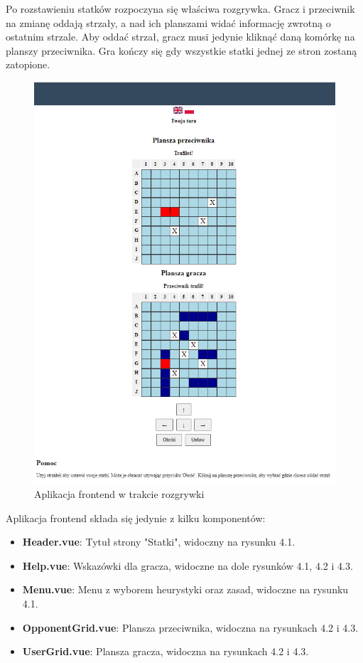 Po rozstawieniu statków rozpoczyna się właściwa rozgrywka. Gracz i przeciwnik na zmianę oddają strzały, a nad ich planszami widać informację zwrotną o ostatnim strzale. Aby oddać strzał, gracz musi jedynie kliknąć daną komórkę na planszy przeciwnika. Gra kończy się gdy wszystkie statki jednej ze stron zostaną zatopione. 

\begin{figure}[!h]
    \label{fig:frontend--in-game}
    \centering \includegraphics[width=1\linewidth]{img/frontend-in-game.PNG}
    \caption{Aplikacja frontend w trakcie rozgrywki}
\end{figure}

Aplikacja frontend składa się jedynie z kilku komponentów:
\begin{itemize}
    \item \textbf{Header.vue}: Tytuł strony "Statki", widoczny na rysunku 4.1.
    \item \textbf{Help.vue}: Wskazówki dla gracza, widoczne na dole rysunków 4.1, 4.2 i 4.3.
    \item \textbf{Menu.vue}: Menu z wyborem heurystyki oraz zasad, widoczne na rysunku 4.1.
    \item \textbf{OpponentGrid.vue}: Plansza przeciwnika, widoczna na rysunkach 4.2 i 4.3.
    \item \textbf{UserGrid.vue}: Plansza gracza, widoczna na rysunkach 4.2 i 4.3.
\end{itemize}

